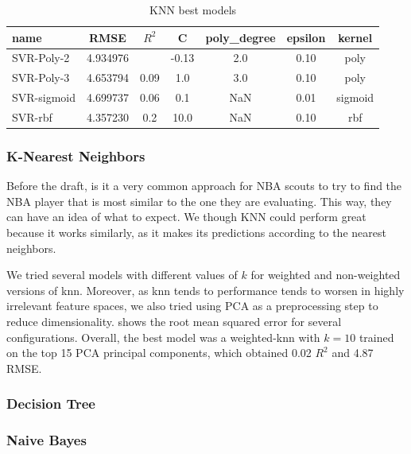 \begin{table}[H]
    \centering
    \begin{tabular}{lcccccc}
    \toprule
    name & RMSE & $R^2$ & C &  poly\_degree &  epsilon & kernel \\
    \midrule
    SVR-Poly-2 & 4.934976 & & -0.13 & 2.0 &  0.10 & poly \\
    SVR-Poly-3 & 4.653794 & 0.09 & 1.0 & 3.0 & 0.10 & poly \\
    SVR-sigmoid & 4.699737 & 0.06 & 0.1 & NaN & 0.01 & sigmoid \\
    SVR-rbf & 4.357230 & 0.2 & 10.0 & NaN & 0.10 &  rbf \\
    \bottomrule
    \end{tabular}
    \caption{KNN best models}
    \label{ml:knn}
\end{table}

\subsubsection{K-Nearest Neighbors}%
\label{ssub:k-nearest-neighbors}

Before the draft, is it a very common approach for NBA scouts to try to find the NBA player that is most similar to the one they are evaluating. This way, they can have an idea of what to expect. We though KNN could perform great because it works similarly, as it makes its predictions according to the nearest neighbors.

We tried several models with different values of $k$ for weighted and non-weighted versions of knn. Moreover, as knn tends to performance tends to worsen in highly irrelevant feature spaces, we also tried using PCA as a preprocessing step to reduce dimensionality. shows the root mean squared error for several configurations. Overall, the best model was a weighted-knn with $k=10$ trained on the top 15 PCA principal components, which obtained 0.02 $R^2$ and 4.87 RMSE.





\subsubsection{Decision Tree}%
\label{ssub:decision-tree}

\subsubsection{Naive Bayes}%
\label{ssub:naive-bayes}

